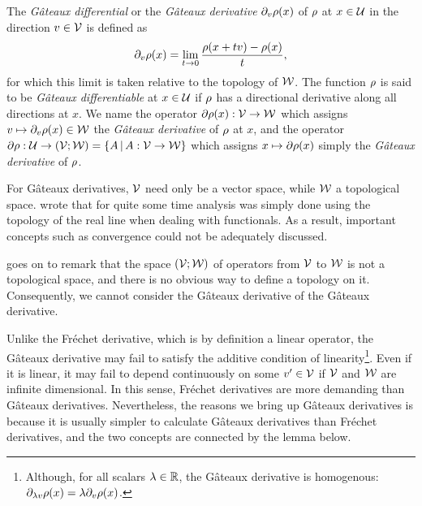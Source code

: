 \begin{definition}
  The \emph{Gâteaux differential} or the \emph{Gâteaux derivative} $\partial_v \rho(x)$ of $\rho$ at $x \in {\mathcal U}$ in the direction $v\in{\mathcal V}$ is defined as
  \[
    \partial_v \funder(x) = \lim_{t \to 0} \frac{\funder(x + t v) - \funder(x)}{t},  %
  \]  
  for which this limit is taken relative to the topology of ${\mathcal W}$.
  The function $\rho$ is said to be \emph{Gâteaux differentiable} at $x\in{\mathcal U}$ if $\rho$ has a directional derivative along all directions at $x$.
  We name the operator $\partial \rho(x):{\mathcal V}\to{\mathcal W}$ which assigns $v \mapsto \partial_v \rho(x) \in {\mathcal W}$ the \emph{Gâteaux derivative} of $\rho$ at $x$, and the operator $\partial \rho :{\mathcal U}\to({\mathcal V};{\mathcal W}) = \{A \,|\, A:{\mathcal V}\to{\mathcal W} \}$ which assigns $x \mapsto \partial \rho(x)$ simply the \emph{Gâteaux derivative} of $\rho$.
  
\end{definition}

\begin{remark}
  For Gâteaux derivatives, ${\mathcal V}$ need only be a vector space, while ${\mathcal W}$ a topological space.
  \citet[p. 55]{tapia1971diff} wrote that for quite some time analysis was simply done using the topology of the real line when dealing with functionals.
  As a result, important concepts such as convergence could not be adequately discussed.
\end{remark}

\begin{remark}
  \citet[p. 52]{tapia1971diff} goes on to remark that the space $({\mathcal V};{\mathcal W})$ of operators from ${\mathcal V}$ to ${\mathcal W}$ is not a topological space, and there is no obvious way to define a topology on it.
  Consequently, we cannot consider the Gâteaux derivative of the Gâteaux derivative.
\end{remark}

Unlike the Fréchet derivative, which is by definition a linear operator, the Gâteaux derivative may fail to satisfy the additive condition of linearity\footnote{Although, for all scalars $\lambda \in \mathbb{R}$, the Gâteaux derivative is homogenous: $\partial_{\lambda v}\rho(x) = \lambda \partial_v \rho(x)$.}.
Even if it is linear, it may fail to depend continuously on some $v'\in{\mathcal V}$ if ${\mathcal V}$ and ${\mathcal W}$ are infinite dimensional.
In this sense, Fréchet derivatives are more demanding than Gâteaux derivatives.
Nevertheless, the reasons we bring up Gâteaux derivatives is because it is usually simpler to calculate Gâteaux derivatives than Fréchet derivatives, and the two concepts are connected by the lemma below.

